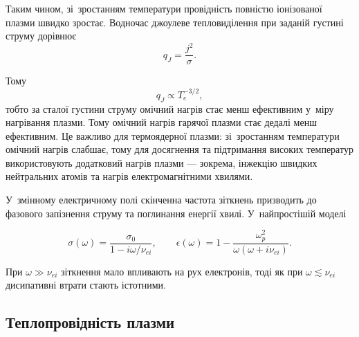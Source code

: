 Таким чином, зі~зростанням температури провідність повністю іонізованої плазми швидко зростає. Водночас джоулеве тепловиділення при заданій густині струму дорівнює
\begin{equation*}
q_J=\frac{j^2}{\sigma}.
\end{equation*}

Тому
\begin{equation*}
q_J\propto T_e^{-3/2},
\end{equation*}
тобто за сталої густини струму омічний нагрів стає менш ефективним у~міру нагрівання плазми.
Тому омічний нагрів гарячої плазми стає дедалі менш ефективним. Це важливо для термоядерної плазми: зі~зростанням температури омічний нагрів слабшає, тому для досягнення та підтримання високих температур використовують додатковий нагрів плазми --- зокрема, інжекцію швидких нейтральних атомів та нагрів електромагнітними хвилями.

У~змінному електричному полі скінченна частота зіткнень призводить до фазового запізнення
струму та поглинання енергії хвилі. У~найпростішій моделі

\begin{equation*}
	\sigma(\omega)=
	\frac{\sigma_0}{1-i\omega/\nu_{ei}},
	\qquad
	\epsilon(\omega)=
	1-\frac{\omega_p^2}
	{\omega(\omega+i\nu_{ei})}.
\end{equation*}

При $\omega\gg\nu_{ei}$ зіткнення мало впливають на рух електронів, тоді як при
$\omega\lesssim\nu_{ei}$ дисипативні втрати стають істотними.

\subsection*{Теплопровідність плазми}


